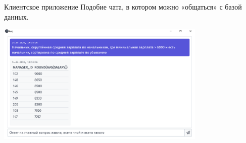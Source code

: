 \begin{frame}{Клиентское приложение}%
  Подобие чата, в котором можно «общаться» с базой данных.
  \begin{center}%
    \includegraphics[width=0.75\textwidth]{img/UI.png}
  \end{center}
\end{frame}
